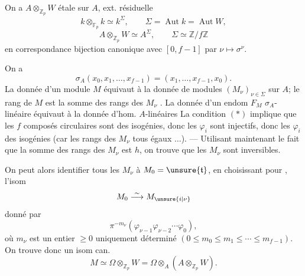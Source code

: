 
On a $A\otimes_{\mathbb Z_p}W$ étale sur $A$, ext. résiduelle
\[
k\otimes_{\mathbb F_p}k\simeq k^\Sigma,\qquad\Sigma=\operatorname{Aut}k=\operatorname{Aut}W,
\]
\[
A\otimes_{\mathbb Z_p}W\simeq A^\Sigma,\qquad \Sigma\simeq\mathbb Z/f\mathbb Z
\]
en correspondance bijection canonique avec $[0,f-1]$ par $\nu\mapsto\sigma^\nu$\quad{}.

On a
\[
\sigma_A(x_0,x_1,\ldots,x_{f-1})=(x_1,\ldots,x_{f-1},x_0).
\]
La donnée d'un module  $M$  équivaut à la donnée de modules $(M_\nu)_{\nu\in\Sigma}$ sur $A$; le rang de $M$ est la somme des rangs des $M_\nu$ . La donnée d'un endom $F_M$ $\sigma_A$-linéaire équivaut à la donnée d'hom. $A$-linéaires
La condition $(*)$  implique que les $f$ composés circulaires sont des isogénies, donc les $\varphi_i$ sont injectifs, donc les $\varphi_i$ des isogénies (car les rangs des $M_\nu$ tous égaux $\ldots$).  --- Utilisant maintenant le fait que la somme des rangs des $M_\nu$ est $h$, on trouve que les $M_\nu$ sont inversibles.

On peut alors identifier tous les $M_\nu$ à  $M_0=\unsure{\mathfrak t}$,  en choisissant  pour , l'isom 
\[
M_0\overset\sim\longrightarrow M_{\unsure{i|\nu}}
\]
donné par
\[
\pi^{-m_\nu}(\varphi_{\nu-1}\varphi_{\nu-2}\cdots\varphi_0),
\]
où $m_\nu$ est un entier $\geq0$ uniquement déterminé $(0\leq m_0\leq m_1\leq\cdots\leq m_{f-1})$. On trouve donc un isom can.
\[
M\simeq\Omega\otimes_{\mathbb Z_p}W=\Omega\otimes_A(A\otimes_{\mathbb Z_p}W).
\]
